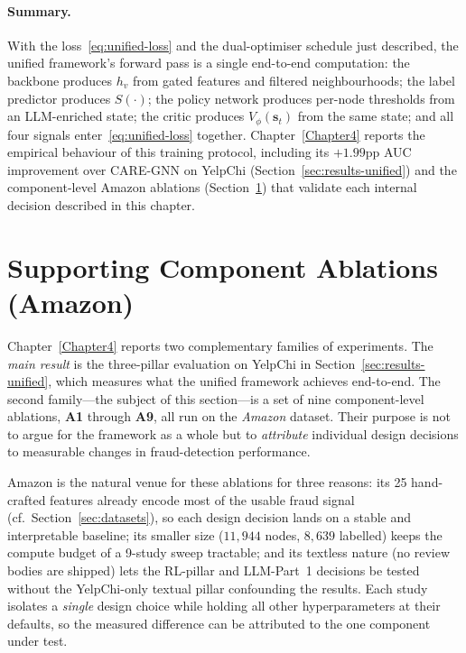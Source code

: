 \paragraph{Summary.} With the loss~\eqref{eq:unified-loss} and the dual-optimiser schedule just described, the unified framework's forward pass is a single end-to-end computation: the backbone produces $h_v$ from gated features and filtered neighbourhoods; the label predictor produces $S(\cdot)$; the policy network produces per-node thresholds from an LLM-enriched state; the critic produces $V_\phi(\mathbf{s}_t)$ from the same state; and all four signals enter~\eqref{eq:unified-loss} together. Chapter~\ref{Chapter4} reports the empirical behaviour of this training protocol, including its $+1.99$pp AUC improvement over CARE-GNN on YelpChi (Section~\ref{sec:results-unified}) and the component-level Amazon ablations (Section~\ref{sec:ablation}) that validate each internal decision described in this chapter.



\section{Supporting Component Ablations (Amazon)}
\label{sec:ablation}

Chapter~\ref{Chapter4} reports two complementary families of experiments. The \emph{main result} is the three-pillar evaluation on YelpChi in Section~\ref{sec:results-unified}, which measures what the unified framework achieves end-to-end. The second family---the subject of this section---is a set of nine component-level ablations, \textbf{A1} through \textbf{A9}, all run on the \emph{Amazon} dataset. Their purpose is not to argue for the framework as a whole but to \emph{attribute} individual design decisions to measurable changes in fraud-detection performance.

Amazon is the natural venue for these ablations for three reasons: its 25 hand-crafted features already encode most of the usable fraud signal (cf.\ Section~\ref{sec:datasets}), so each design decision lands on a stable and interpretable baseline; its smaller size ($11{,}944$ nodes, $8{,}639$ labelled) keeps the compute budget of a 9-study sweep tractable; and its textless nature (no review bodies are shipped) lets the RL-pillar and LLM-Part~1 decisions be tested without the YelpChi-only textual pillar confounding the results. Each study isolates a \emph{single} design choice while holding all other hyperparameters at their defaults, so the measured difference can be attributed to the one component under test.

